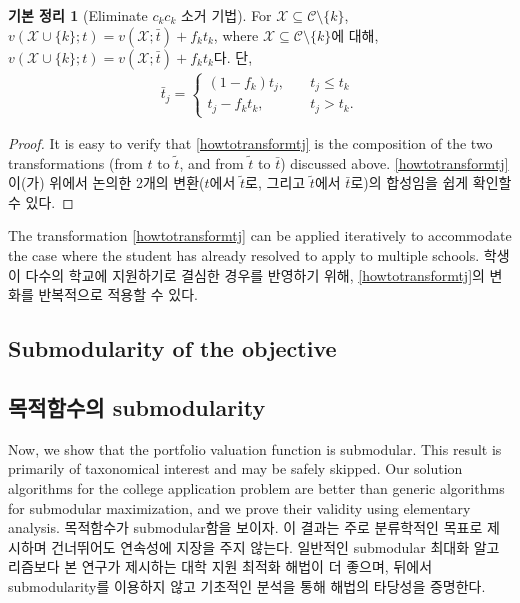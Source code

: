 \documentclass[11pt]{article} %
\newtheorem{lemma}{Lemma}
\theoremstyle{definition}
\newtheorem{lemma}{기본 정리}
\theoremstyle{definition}
\begin{document}
\begin{lemma}[\ifen Eliminate $c_k$\else $c_k$ 소거 기법\fi] \label{eliminationtheorem}
\ifen For $\mathcal{X} \subseteq \mathcal{C} \setminus \{k\}$, $v(\mathcal{X}\cup\{k\}; t)  = v(\mathcal{X}; \bar t) + f_k t_k$, where
\else $\mathcal{X} \subseteq \mathcal{C} \setminus \{k\}$에 대해, $v(\mathcal{X}\cup\{k\}; t)  = v(\mathcal{X}; \bar t) + f_k t_k$다. 단,\fi
\begin{align}\label{howtotransformtj}
\bar t_j = 
\begin{cases}
(1 - f_k) t_j, \quad & t_j \leq t_k \\
t_j - f_k t_k, \quad& t_j > t_k.
\end{cases}
\end{align}
\end{lemma}

\begin{proof}
\ifen It is easy to verify that \eqref{howtotransformtj} is the composition of the two transformations (from $t$ to $\tilde t$, and from $\tilde t$ to $\bar t$) discussed above.
\else \eqref{howtotransformtj}이(가) 위에서 논의한 2개의 변환($t$에서 $\tilde t$로, 그리고 $\tilde t$에서 $\bar t$로)의 합성임을 쉽게 확인할 수 있다. \fi
\end{proof}

\ifen
\noindent The transformation \eqref{howtotransformtj} can be applied iteratively to accommodate the case where the student has already resolved to apply to multiple schools.
\else
\noindent 학생이 다수의 학교에 지원하기로 결심한 경우를 반영하기 위해, \eqref{howtotransformtj}의 변화를 반복적으로 적용할 수 있다.
\fi


\ifen \subsection{Submodularity of the objective} \else \subsection{목적함수의 submodularity} \fi
\ifen 
Now, we show that the portfolio valuation function is submodular. This result is primarily of taxonomical interest and may be safely skipped. Our solution algorithms for the college application problem are better than generic algorithms for submodular maximization, and we prove their validity using elementary analysis.
\else
목적함수가 submodular함을 보이자. 이 결과는 주로 분류학적인 목표로 제시하며 건너뛰어도 연속성에 지장을 주지 않는다. 일반적인 submodular 최대화 알고리즘보다 본 연구가 제시하는 대학 지원 최적화 해법이 더 좋으며, 뒤에서 submodularity를 이용하지 않고 기초적인 분석을 통해 해법의 타당성을 증명한다.
\fi
\end{document}
